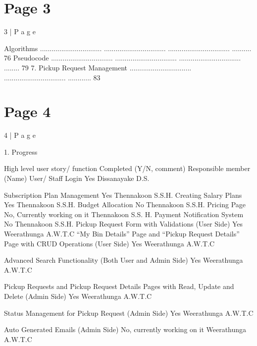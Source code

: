 \documentclass{article}
\begin{document}
\section*{Page 3}
3 | P a g e 
 
Algorithms ................................ ................................ ................................ .......... 76 
Pseudocode ................................ ................................ ................................ ........ 79 
7. Pickup Request Management ................................ ................................ ............ 83 
 
 
 
 
 
 
 
 
 
 
 
 
 
 
 
 
 
 
 
 
 
 
 

\section*{Page 4}
4 | P a g e 
 
 
1. Progress 
 
High level user story/ function Completed 
(Y/N, 
comment) 
Responsible 
member (Name) 
User/ Staff Login Yes Dissanayake D.S. 
   
   
Subscription Plan Management Yes Thennakoon 
S.S.H. 
Creating Salary Plans Yes Thennakoon 
S.S.H. 
Budget Allocation  No  Thennakoon 
S.S.H. 
Pricing Page No, Currently 
working on it 
Thennakoon S.S. 
H. 
Payment Notification System No Thennakoon 
S.S.H. 
Pickup Request Form with Validations (User Side) Yes Weerathunga 
A.W.T.C 
“My Bin Details” Page and “Pickup Request Details” 
Page with CRUD Operations (User Side) 
Yes Weerathunga 
A.W.T.C 
 
Advanced Search Functionality (Both User and 
Admin Side) 
Yes Weerathunga 
A.W.T.C 
 
Pickup Requests and Pickup Request Details Pages 
with Read, Update and Delete (Admin Side) 
Yes Weerathunga 
A.W.T.C 
 
Status Management for Pickup Request (Admin 
Side) 
Yes Weerathunga 
A.W.T.C 
 
Auto Generated Emails (Admin Side) No, currently 
working on it 
Weerathunga 
A.W.T.C 
 
\end{document}
